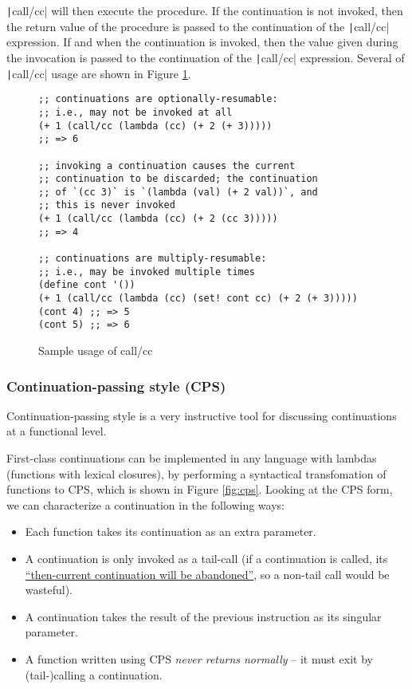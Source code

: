 \documentclass[]{article}
\begin{document}
\texttt|call/cc| will then execute the procedure. If the continuation is not invoked, then the return value of the procedure is passed to the continuation of the \texttt|call/cc| expression. If and when the continuation is invoked, then the value given during the invocation is passed to the continuation of the \texttt|call/cc| expression. Several of \texttt|call/cc| usage are shown in Figure \ref{fig:ccce}.

\begin{figure}
  \centering
\begin{verbatim}
;; continuations are optionally-resumable:
;; i.e., may not be invoked at all
(+ 1 (call/cc (lambda (cc) (+ 2 (+ 3)))))
;; => 6

;; invoking a continuation causes the current
;; continuation to be discarded; the continuation
;; of `(cc 3)` is `(lambda (val) (+ 2 val))`, and
;; this is never invoked
(+ 1 (call/cc (lambda (cc) (+ 2 (cc 3)))))
;; => 4

;; continuations are multiply-resumable:
;; i.e., may be invoked multiple times
(define cont '())
(+ 1 (call/cc (lambda (cc) (set! cont cc) (+ 2 (+ 3)))))
(cont 4) ;; => 5
(cont 5) ;; => 6
\end{verbatim}
  \caption{Sample usage of call/cc}
  \label{fig:ccce}
\end{figure}

\subsubsection{Continuation-passing style (CPS)}
\label{sec:cps}

Continuation-passing style is a very instructive tool for discussing continuations at a functional level.

First-class continuations can be implemented in any language with lambdas (functions with lexical closures), by performing a syntactical transfomation of functions to CPS, which is shown in Figure \ref{fig:cps}. Looking at the CPS form, we can characterize a continuation in the following ways:
\begin{itemize}
\item Each function takes its continuation as an extra parameter.
\item A continuation is only invoked as a tail-call (if a continuation is called, its \href{https://wiki.c2.com/?CallWithCurrentContinuation}{``then-current continuation will be abandoned''}, so a non-tail call would be wasteful).
\item A continuation takes the result of the previous instruction as its singular parameter.
\item A function written using CPS \textit{never returns normally} -- it must exit by (tail-)calling a continuation.
\end{itemize}
\end{document}
